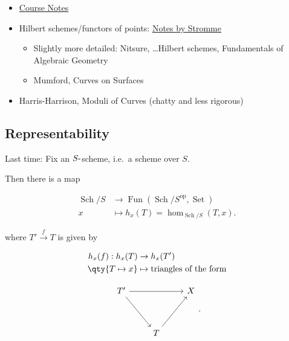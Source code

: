 \begin{itemize}
\item
  \href{https://sites.google.com/view/benbakker/math-8330?authuser=0}{Course
  Notes}
\item
  Hilbert schemes/functors of points:
  \href{http://matwbn.icm.edu.pl/ksiazki/bcp/bcp36/bcp36111.pdf}{Notes
  by Stromme}

  \begin{itemize}
  \item
    Slightly more detailed: Nitsure, \ldots Hilbert schemes,
    Fundamentals of Algebraic Geometry
  \item
    Mumford, Curves on Surfaces
  \end{itemize}
\item
  Harris-Harrison, Moduli of Curves (chatty and less rigorous)
\end{itemize}

\hypertarget{representability}{%
\subsection{Representability}\label{representability}}

Last time: Fix an \(S{\hbox{-}}\)scheme, i.e.~a scheme over \(S\).

Then there is a map

\begin{align*} {\operatorname{Sch}}/S &\to {\operatorname{Fun}}( {\operatorname{Sch}}/S^\operatorname{op}, {\operatorname{Set}})\\ x &\mapsto h_x(T) = \hom_{{\operatorname{Sch}}/S}(T, x) .\end{align*}

where \(T' \xrightarrow{f} T\) is given by

\begin{align*} h_x(f): h_x(T) &\to h_x(T') \\ \qty{ T \mapsto x } &\mapsto \text{triangles of the form} \end{align*}

\begin{equation*} \begin{tikzcd} T' \arrow[rr] \arrow[rdd] &               & X \\                           &               &   \\                           & T \arrow[ruu] &   \end{tikzcd} .\end{equation*}

